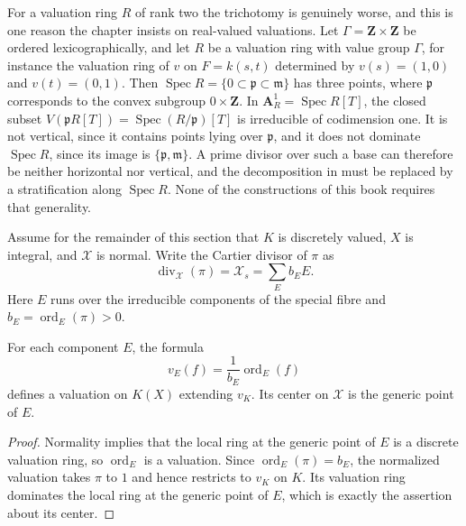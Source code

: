 \begin{remark}
\label{rem:vertical-horizontal-higher-rank}
For a valuation ring $R$ of rank two the trichotomy is genuinely worse, and
this is one reason the chapter insists on real-valued valuations.  Let
$\Gamma=\mathbf Z\times\mathbf Z$ be ordered lexicographically, and let $R$
be a valuation ring with value group $\Gamma$, for instance the valuation
ring of $v$ on $F=k(s,t)$ determined by $v(s)=(1,0)$ and $v(t)=(0,1)$.
Then $\operatorname{Spec}R=\{0\subset\mathfrak p\subset\mathfrak m\}$ has
three points, where $\mathfrak p$ corresponds to the convex subgroup
$0\times\mathbf Z$.  In $\mathbf A^1_R=\operatorname{Spec}R[T]$, the closed
subset $V(\mathfrak pR[T])=\operatorname{Spec}(R/\mathfrak p)[T]$ is
irreducible of codimension one.  It is not vertical, since it contains
points lying over $\mathfrak p$, and it does not dominate
$\operatorname{Spec}R$, since its image is
$\{\mathfrak p,\mathfrak m\}$.  A prime divisor over such a base can
therefore be neither horizontal nor vertical, and the decomposition in
 must be replaced by a stratification along
$\operatorname{Spec}R$.  None of the constructions of this book requires
that generality.
\end{remark}

Assume for the remainder of this section that $K$ is discretely valued,
$X$ is integral, and $\mathcal X$ is normal. Write the Cartier divisor
of $\pi$ as
\[
                       \operatorname{div}_{\mathcal X}(\pi)
                       =\mathcal X_s=\sum_E b_EE.
\]
Here $E$ runs over the irreducible components of the special fibre and
$b_E=\operatorname{ord}_E(\pi)>0$.

\begin{proposition}
\label{prop:component-valuation}
For each component $E$, the formula
\[
                         v_E(f)=\frac{1}{b_E}\operatorname{ord}_E(f)
\]
defines a valuation on $K(X)$ extending $v_K$. Its center on $\mathcal X$ is
the generic point of $E$.
\end{proposition}
\begin{proof}
Normality implies that the local ring at the generic point of $E$ is a
discrete valuation ring, so $\operatorname{ord}_E$ is a valuation. Since
$\operatorname{ord}_E(\pi)=b_E$, the normalized valuation takes $\pi$ to $1$
and hence restricts to $v_K$ on $K$. Its valuation ring dominates the local
ring at the generic point of $E$, which is exactly the assertion about its
center.
\end{proof}


